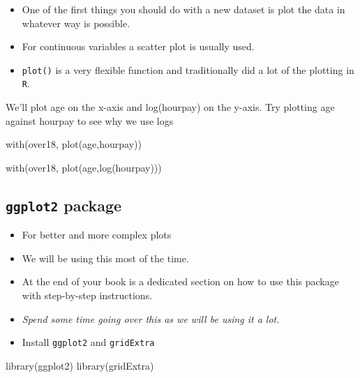 \documentclass[
]{gitbook}
\newenvironment{Shaded}{\begin{snugshade}}{\end{snugshade}}
\newcommand{\FunctionTok}[1]{\textcolor[rgb]{0.00,0.00,0.00}{#1}}
\newcommand{\NormalTok}[1]{#1}
\providecommand{\tightlist}{%
  \setlength{\itemsep}{0pt}\setlength{\parskip}{0pt}}
\begin{document}
\begin{itemize}
\tightlist
\item
  One of the first things you should do with a new dataset is plot the data in whatever way is possible.
\item
  For continuous variables a scatter plot is usually used.
\item
  \texttt{plot()} is a very flexible function and traditionally did a lot of the plotting in \texttt{R}.
\end{itemize}

We'll plot age on the x-axis and log(hourpay) on the y-axis. Try plotting age against hourpay to see why we use logs

\begin{Shaded}
\begin{Highlighting}[]
\FunctionTok{with}\NormalTok{(over18, }\FunctionTok{plot}\NormalTok{(age,hourpay))}
\end{Highlighting}
\end{Shaded}

\begin{Shaded}
\begin{Highlighting}[]
\FunctionTok{with}\NormalTok{(over18, }\FunctionTok{plot}\NormalTok{(age,}\FunctionTok{log}\NormalTok{(hourpay)))}
\end{Highlighting}
\end{Shaded}

\hypertarget{ggplot2-package}{%
\subsection{\texorpdfstring{\texttt{ggplot2} package}{ggplot2 package}}\label{ggplot2-package}}

\begin{itemize}
\tightlist
\item
  For better and more complex plots
\item
  We will be using this most of the time.
\item
  At the end of your book is a dedicated section on how to use this package with step-by-step instructions.
\item
  \emph{Spend some time going over this as we will be using it a lot.}
\item
  Install \texttt{ggplot2} and \texttt{gridExtra}
\end{itemize}

\begin{Shaded}
\begin{Highlighting}[]
\FunctionTok{library}\NormalTok{(ggplot2)}
\FunctionTok{library}\NormalTok{(gridExtra)}
\end{Highlighting}
\end{Shaded}
\end{document}
